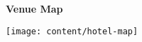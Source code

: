 \thispagestyle{empty}

\begin{center}
  \vspace{4em}

  {\huge\bf Venue Map}

  \vspace{1em}

  \texttt{[image: content/hotel-map]}
\end{center}

%
%
%
